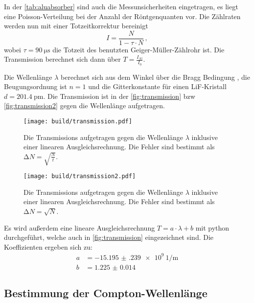   \noindent In der \autoref{tab:aluabsorber} sind auch die Messunsicherheiten eingetragen, es liegt eine Poisson-Verteilung bei der Anzahl der Röntgenquanten 
  vor. Die Zählraten werden nun mit einer Totzeitkorrektur bereinigt
  \begin{equation*}
    I = \frac{N}{1 - \tau \cdot N} \, , 
  \end{equation*}
  wobei $\tau = \SI{90}{\micro\second}$ die Totzeit des benutzten Geiger-Müller-Zählrohr ist. Die Transmission berechnet sich dann über $T = \frac{I_{\text{Al}}}{I_0}$.

  \noindent Die Wellenlänge $\lambda $ berechnet sich aus dem Winkel über die Bragg Bedingung , die Beugungsordnung ist $n=1$ und die Gitterkonstante für einen 
  LiF-Kristall $d = \SI{201.4}{\pico\metre}$. Die Transmission ist in der \autoref{fig:transmission} bzw \autoref{fig:transmission2} gegen die Wellenlänge aufgetragen.

  \begin{figure}[H]
    \centering
    \texttt{[image: build/transmission.pdf]}
    \caption{Die Transmissions aufgetragen gegen die Wellenlänge $\lambda$ inklusive einer linearen Ausgleichsrechnung. Die Fehler sind bestimmt als $ \increment
    N = \sqrt{\frac{N}{t}}$. }
    \label{fig:transmission}
  \end{figure}

  \begin{figure}[H]
    \centering
    \texttt{[image: build/transmission2.pdf]}
    \caption{Die Transmissions aufgetragen gegen die Wellenlänge $\lambda$ inklusive einer linearen Ausgleichsrechnung. Die Fehler sind bestimmt als $\increment
    N = \sqrt{N}$.}
    \label{fig:transmission2}
  \end{figure}

  \noindent Es wird außerdem eine lineare Ausgleichsrechnung $T = a \cdot \lambda + b$ mit python durchgeführt, welche auch in \autoref{fig:transmission} eingezeichnet 
  sind. Die Koeffizienten ergeben sich zu:
  \begin{align*}
    a &= \SI{-15.195(239)e9}{1\per\metre}\\
    b &= \num{1.225(14)}
  \end{align*}


\subsection{Bestimmung der Compton-Wellenlänge} %


